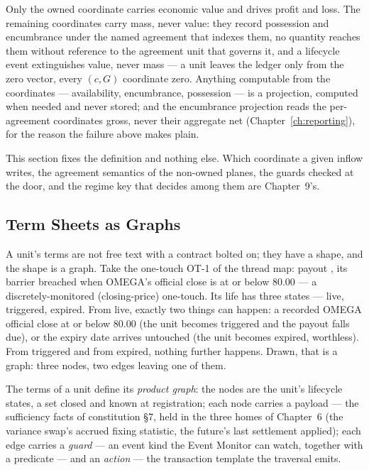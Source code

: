 Only the owned coordinate carries economic value and drives profit and loss. The remaining
coordinates carry mass, never value: they record possession and encumbrance under the
named agreement that indexes them, no quantity reaches them without reference to the
agreement unit that governs it, and a lifecycle event extinguishes value, never mass ---
a unit leaves the ledger only from the zero vector, every $(c,G)$ coordinate zero. Anything
computable from the coordinates --- availability, encumbrance, possession --- is a
projection, computed when needed and never stored; and the encumbrance projection reads
the per-agreement coordinates gross, never their aggregate net
(Chapter~\ref{ch:reporting}), for the reason the failure above makes plain.

This section fixes the definition and nothing else. Which coordinate a given inflow
writes, the agreement semantics of the non-owned planes, the guards checked at the door,
and the regime key that decides among them are Chapter~9's.

\subsection{Term Sheets as Graphs}\label{sec:termsheet-graphs}

A unit's terms are not free text with a contract bolted on; they have a shape, and the
shape is a graph. Take the one-touch OT-1 of the thread map: payout ,
its barrier breached when OMEGA's official close is at or below 80.00 --- a
discretely-monitored (closing-price) one-touch. Its life has three states --- live,
triggered, expired. From live, exactly two things can happen: a recorded OMEGA official
close at or below 80.00 (the unit becomes triggered and the payout falls due), or the
expiry date arrives untouched (the unit becomes expired, worthless). From triggered and
from expired, nothing further happens. Drawn, that is a graph: three nodes, two edges
leaving one of them.

\begin{definition}\label{def:product-graph}
The terms of a unit define its \emph{product graph}: the nodes are the unit's lifecycle
states, a set closed and known at registration; each node carries a payload --- the
sufficiency facts of constitution \S 7, held in the three homes of Chapter~6 (the
variance swap's accrued fixing statistic, the future's last settlement applied); each
edge carries a \emph{guard} --- an event kind the Event Monitor can watch, together with
a predicate --- and an \emph{action} --- the transaction template the traversal emits.
\end{definition}

